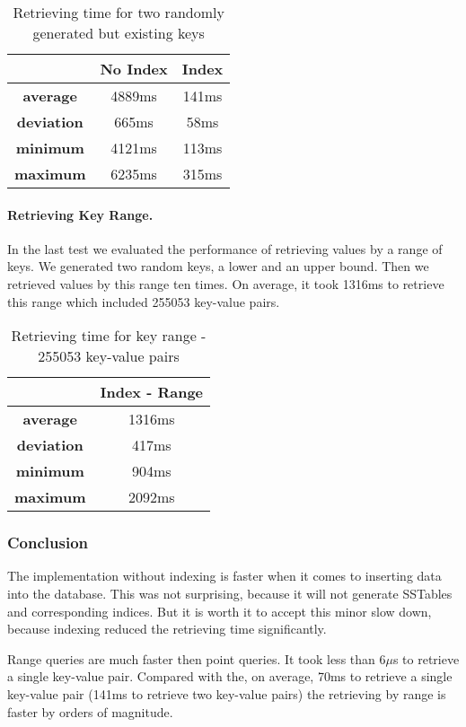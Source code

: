 \documentclass[a4paper, twocolumn,11pt]{article}
\begin{document}
\begin{table}[h]
\centering
\begin{tabular}{c c c}
\hline
 & \textbf{No Index} & \textbf{Index}\\
\hline
\textbf{average} & 4889ms & 141ms\\
\textbf{deviation} & 665ms & 58ms\\
\textbf{minimum} & 4121ms & 113ms\\
\textbf{maximum} & 6235ms & 315ms\\

\hline
\end{tabular}
\caption{Retrieving time for two randomly generated but existing keys}
\end{table}

\paragraph{Retrieving Key Range.} In the last test we evaluated the performance of retrieving values by a range of keys. We generated two random keys, a lower and an upper bound. Then we retrieved values by this range ten times. On average, it took 1316ms to retrieve this range which included 255053 key-value pairs.     

\begin{table}[h]
\centering
\begin{tabular}{c c }
\hline
 & \textbf{Index - Range} \\
\hline
\textbf{average} & 1316ms\\
\textbf{deviation} & 417ms\\
\textbf{minimum} & 904ms\\
\textbf{maximum} & 2092ms\\

\hline
\end{tabular}
\caption{Retrieving time for key range - 255053 key-value pairs}
\end{table}
\subsubsection{Conclusion}
The implementation without indexing is faster when it comes to inserting data into the database. This was not surprising, because it will not generate SSTables and corresponding indices. But it is worth it to accept this minor slow down, because indexing reduced the retrieving time significantly. 

Range queries are much faster then point queries. It took less than 6$\mu$s to retrieve a single key-value pair. Compared with the, on average, 70ms to retrieve a single key-value pair (141ms to retrieve two key-value pairs) the retrieving by range is faster by orders of magnitude. 
\end{document}
